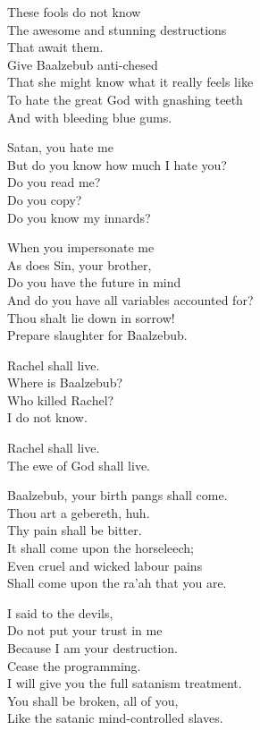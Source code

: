 \documentclass[
]{book}
\begin{document}
These fools do not know\\
The awesome and stunning destructions\\
That await them.\\
Give Baalzebub anti-chesed\\
That she might know what it really feels like\\
To hate the great God with gnashing teeth\\
And with bleeding blue gums.

Satan, you hate me\\
But do you know how much I hate you?\\
Do you read me?\\
Do you copy?\\
Do you know my innards?

When you impersonate me\\
As does Sin, your brother,\\
Do you have the future in mind\\
And do you have all variables accounted for?\\
Thou shalt lie down in sorrow!\\
Prepare slaughter for Baalzebub.

Rachel shall live.\\
Where is Baalzebub?\\
Who killed Rachel?\\
I do not know.

Rachel shall live.\\
The ewe of God shall live.

Baalzebub, your birth pangs shall come.\\
Thou art a gebereth, huh.\\
Thy pain shall be bitter.\\
It shall come upon the horseleech;\\
Even cruel and wicked labour pains\\
Shall come upon the ra'ah that you are.

I said to the devils,\\
Do not put your trust in me\\
Because I am your destruction.\\
Cease the programming.\\
I will give you the full satanism treatment.\\
You shall be broken, all of you,\\
Like the satanic mind-controlled slaves.
\end{document}
